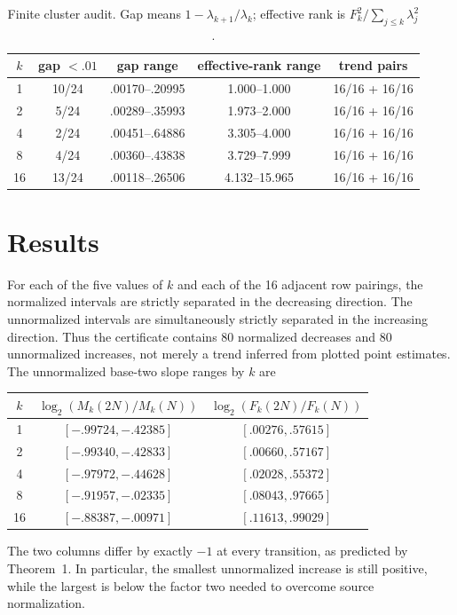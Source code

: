 \documentclass[10pt]{article}
\begin{document}
\begin{table}[t]
\centering
\small
\caption{Finite cluster audit.  Gap means
$1-\lambda_{k+1}/\lambda_k$; effective rank is
$F_k^2/\sum_{j\leq k}\lambda_j^2$.}
\begin{tabular}{c c c c c}
\toprule
$k$ & gap $<.01$ & gap range & effective-rank range & trend pairs\\
\midrule
1  & 10/24 & .00170--.20995 & 1.000--1.000 & 16/16 + 16/16\\
2  & 5/24  & .00289--.35993 & 1.973--2.000 & 16/16 + 16/16\\
4  & 2/24  & .00451--.64886 & 3.305--4.000 & 16/16 + 16/16\\
8  & 4/24  & .00360--.43838 & 3.729--7.999 & 16/16 + 16/16\\
16 & 13/24 & .00118--.26506 & 4.132--15.965 & 16/16 + 16/16\\
\bottomrule
\end{tabular}
\label{tab:clusters}
\end{table}

\section{Results}

For each of the five values of $k$ and each of the 16 adjacent row pairings,
the normalized intervals are strictly separated in the decreasing direction.
The unnormalized intervals are simultaneously strictly separated in the
increasing direction.  Thus the certificate contains 80 normalized decreases
and 80 unnormalized increases, not merely a trend inferred from plotted point
estimates.  The unnormalized base-two slope ranges by $k$ are
\begin{center}
\small
\begin{tabular}{c c c}
\toprule
$k$ & $\log_2(M_k(2N)/M_k(N))$ & $\log_2(F_k(2N)/F_k(N))$\\
\midrule
1  & $[-.99724,-.42385]$ & $[.00276,.57615]$\\
2  & $[-.99340,-.42833]$ & $[.00660,.57167]$\\
4  & $[-.97972,-.44628]$ & $[.02028,.55372]$\\
8  & $[-.91957,-.02335]$ & $[.08043,.97665]$\\
16 & $[-.88387,-.00971]$ & $[.11613,.99029]$\\
\bottomrule
\end{tabular}
\end{center}
The two columns differ by exactly $-1$ at every transition, as predicted by
Theorem~1.  In particular, the smallest unnormalized increase is still
positive, while the largest is below the factor two needed to overcome source
normalization.
\end{document}
